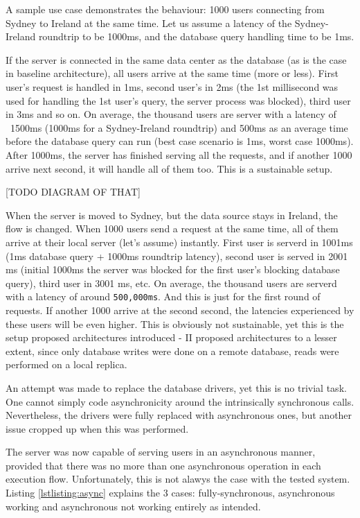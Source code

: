 \documentclass{uvamscse}
\begin{document}
A sample use case demonstrates the behaviour: 1000 users connecting from Sydney to Ireland at the same time. Let us assume a latency of the Sydney-Ireland roundtrip to be 1000ms, and the database query handling time to be 1ms.

If the server is connected in the same data center as the database (as is the case in baseline architecture), all users arrive at the same time (more or less). First user's request is handled in 1ms, second user's in 2ms (the 1st millisecond was used for handling the 1st user's query, the server process was blocked), third user in 3ms and so on. On average, the thousand users are server with a latency of ~1500ms (1000ms for a Sydney-Ireland roundtrip) and 500ms as an average time before the database query can run (best case scenario is 1ms, worst case 1000ms). After 1000ms, the server has finished serving all the requests, and if another 1000 arrive next second, it will handle all of them too. This is a sustainable setup.

[TODO DIAGRAM OF THAT]

When the server is moved to Sydney, but the data source stays in Ireland, the flow is changed. When 1000 users send a request at the same time, all of them arrive at their local server (let's assume) instantly. First user is serverd in 1001ms (1ms database query + 1000ms roundtrip latency), second user is served in 2001 ms (initial 1000ms the server was blocked for the first user's blocking database query), third user in 3001 ms, etc. On average, the thousand users are serverd with a latency of around \texttt{500,000ms}. And this is just for the first round of requests. If another 1000 arrive at the second second, the latencies experienced by these users will be even higher. This is obviously not sustainable, yet this is the setup proposed architectures introduced - II proposed architectures to a lesser extent, since only database writes were done on a remote database, reads were performed on a local replica.

An attempt was made to replace the database drivers, yet this is no trivial task. One cannot simply code asynchronicity around the intrinsically synchronous calls. Nevertheless, the drivers were fully replaced with asynchronous ones, but another issue cropped up when this was performed.

The server was now capable of serving users in an asynchronous manner, provided that there was no more than one asynchronous operation in each execution flow. Unfortunately, this is not alawys the case with the tested system. Listing \ref{lstlisting:async} explains the 3 cases: fully-synchronous, asynchronous working and asynchronous not working entirely as intended.
\end{document}
